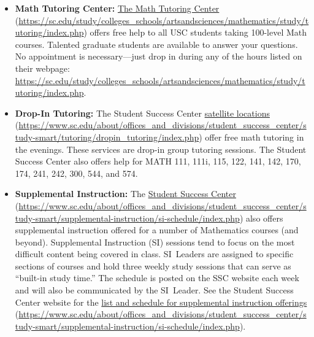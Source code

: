 \documentclass[11pt,letterpaper]{article}
\begin{document}
\newpage





	\begin{itemize}
	\item {\bfseries Math Tutoring Center:} \href{https://sc.edu/study/colleges\_schools/artsandsciences/mathematics/study/tutoring/index.php}{The Math Tutoring Center} (\url{https://sc.edu/study/colleges\_schools/artsandsciences/mathematics/study/tutoring/index.php}) offers free help to all USC students taking 100-level Math courses. Talented graduate students are available to answer your questions. No appointment is necessary---just drop in during any of the hours listed on their webpage: \url{https://sc.edu/study/colleges\_schools/artsandsciences/mathematics/study/tutoring/index.php}. 
	
	\item {\bfseries Drop-In Tutoring:} The Student Success Center \href{https://www.sc.edu/about/offices\_and\_divisions/student\_success\_center/study-smart/tutoring/dropin\_tutoring/index.php}{satellite locations} (\url{https://www.sc.edu/about/offices\_and\_divisions/student\_success\_center/study-smart/tutoring/dropin\_tutoring/index.php}) offer free math tutoring in the evenings. These services are drop-in group tutoring sessions. The Student Success Center also offers help for MATH 111, 111i, 115, 122, 141, 142, 170, 174, 241, 242, 300, 544, and 574. 
	
	\item {\bfseries Supplemental Instruction:} The \href{https://www.sc.edu/about/offices\_and\_divisions/student\_success\_center/study-smart/supplemental-instruction/si-schedule/index.php}{Student Success Center} (\url{https://www.sc.edu/about/offices\_and\_divisions/student\_success\_center/study-smart/supplemental-instruction/si-schedule/index.php}) also offers supplemental instruction offered for a number of Mathematics courses (and beyond). Supplemental Instruction (SI) sessions tend to focus on the most difficult content being covered in class. SI~Leaders are assigned to specific sections of courses and hold three weekly study sessions that can serve as ``built-in study time.'' The schedule is posted on the SSC website each week and will also be communicated by the SI~Leader. See the Student Success Center website for the \href{https://www.sc.edu/about/offices\_and\_divisions/student\_success\_center/study-smart/supplemental-instruction/si-schedule/index.php}{list and schedule for supplemental instruction offerings} (\url{https://www.sc.edu/about/offices\_and\_divisions/student\_success\_center/study-smart/supplemental-instruction/si-schedule/index.php}).
		

\end{itemize}
\end{document}
